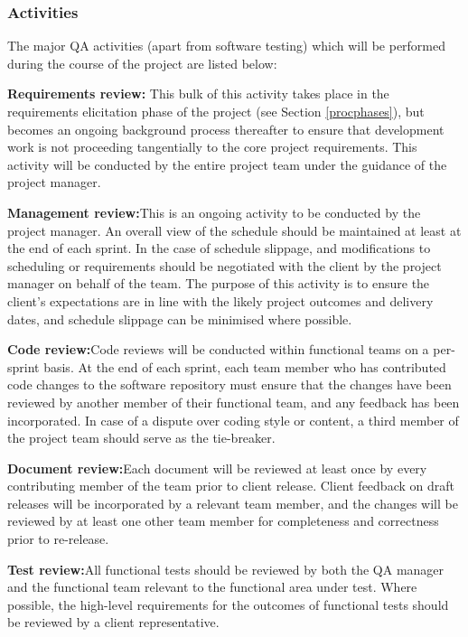 \documentclass[12pt]{article}
\begin{document}
\subsubsection{Activities}  
The major QA activities (apart from software testing) which will be performed during the course of the project are listed below:
\begin{description}
\item{\textbf{Requirements review:}} This bulk of this activity takes place in the requirements elicitation phase of the project (see Section \ref{procphases}), but becomes an ongoing background process thereafter to ensure that development work is not proceeding tangentially to the core project requirements. This activity will be conducted by the entire project team under the guidance of the project manager.
\item{\textbf{Management review:}}This is an ongoing activity to be conducted by the project manager.  An overall view of the schedule should be maintained at least at the end of each sprint. In the case of schedule slippage, and modifications to scheduling or requirements should be negotiated with the client by the project manager on behalf of the team. The purpose of this activity is to ensure the client's expectations are in line with the likely project outcomes and delivery dates, and schedule slippage can be minimised where possible.
\item{\textbf{Code review:}}Code reviews will be conducted within functional teams on a per-sprint basis. At the end of each sprint, each team member who has contributed code changes to the software repository must ensure that the changes have been reviewed by another member of their functional team, and any feedback has been incorporated. In case of a dispute over coding style or content, a third member of the project team should serve as the tie-breaker.
\item{\textbf{Document review:}}Each document will be reviewed at least once by every contributing member of the team prior to client release. Client feedback on draft releases will be incorporated by a relevant team member, and the changes will be reviewed by at least one other team member for completeness and correctness prior to re-release.
\item{\textbf{Test review:}}All functional tests should be reviewed by both the QA manager and the functional team relevant to the functional area under test. Where possible, the high-level requirements for the outcomes of functional tests should be reviewed by a client representative. 
\end{description}
\end{document}
